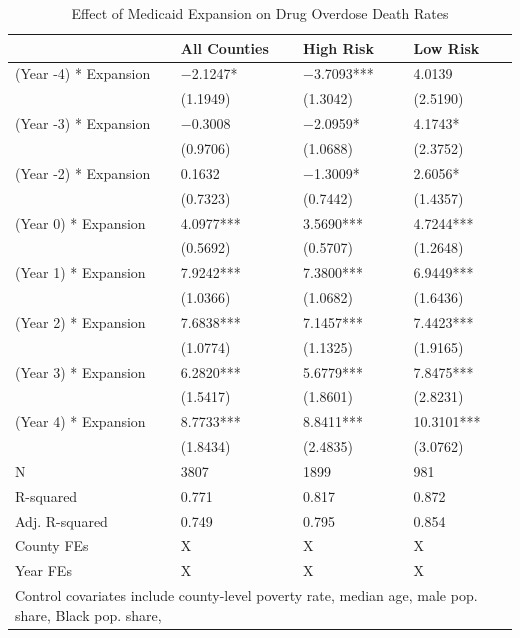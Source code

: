\documentclass[
  11pt,
]{article}
\begin{document}
\begin{table}[!h]

\caption{\label{tab:tabulate ES estimates}Effect of Medicaid Expansion on Drug Overdose Death Rates}
\centering
\begin{tabular}[t]{l>{\centering\arraybackslash}p{1.5in}>{\centering\arraybackslash}p{1.5in}>{\centering\arraybackslash}p{1.5in}}
\toprule
  & All Counties & High Risk & Low Risk\\
\midrule
(Year -4) * Expansion & \num{-2.1247}* & \num{-3.7093}*** & \num{4.0139}\\
 & (\num{1.1949}) & (\num{1.3042}) & (\num{2.5190})\\
(Year -3) * Expansion & \num{-0.3008} & \num{-2.0959}* & \num{4.1743}*\\
 & (\num{0.9706}) & (\num{1.0688}) & (\num{2.3752})\\
(Year -2) * Expansion & \num{0.1632} & \num{-1.3009}* & \num{2.6056}*\\
 & (\num{0.7323}) & (\num{0.7442}) & (\num{1.4357})\\
(Year 0) * Expansion & \num{4.0977}*** & \num{3.5690}*** & \num{4.7244}***\\
 & (\num{0.5692}) & (\num{0.5707}) & (\num{1.2648})\\
(Year 1) * Expansion & \num{7.9242}*** & \num{7.3800}*** & \num{6.9449}***\\
 & (\num{1.0366}) & (\num{1.0682}) & (\num{1.6436})\\
(Year 2) * Expansion & \num{7.6838}*** & \num{7.1457}*** & \num{7.4423}***\\
 & (\num{1.0774}) & (\num{1.1325}) & (\num{1.9165})\\
(Year 3) * Expansion & \num{6.2820}*** & \num{5.6779}*** & \num{7.8475}***\\
 & (\num{1.5417}) & (\num{1.8601}) & (\num{2.8231})\\
(Year 4) * Expansion & \num{8.7733}*** & \num{8.8411}*** & \num{10.3101}***\\
 & (\num{1.8434}) & (\num{2.4835}) & (\num{3.0762})\\
\midrule
N & \num{3807} & \num{1899} & \num{981}\\
R-squared & \num{0.771} & \num{0.817} & \num{0.872}\\
Adj. R-squared & \num{0.749} & \num{0.795} & \num{0.854}\\
County FEs & X & X & X\\
Year FEs & X & X & X\\
\bottomrule
\multicolumn{4}{l}{\rule{0pt}{1em}Control covariates include county-level poverty rate, median age, male pop. share, Black pop. share,}\\

\end{tabular}
\end{table}
\end{document}
